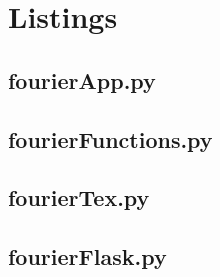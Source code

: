 \documentclass[a4paper,pdftex]{scrartcl}
\begin{document}
\appendix
\section{Listings}
\subsection{fourierApp.py}

\subsection{fourierFunctions.py}

\subsection{fourierTex.py}

\subsection{fourierFlask.py}

\end{document}
